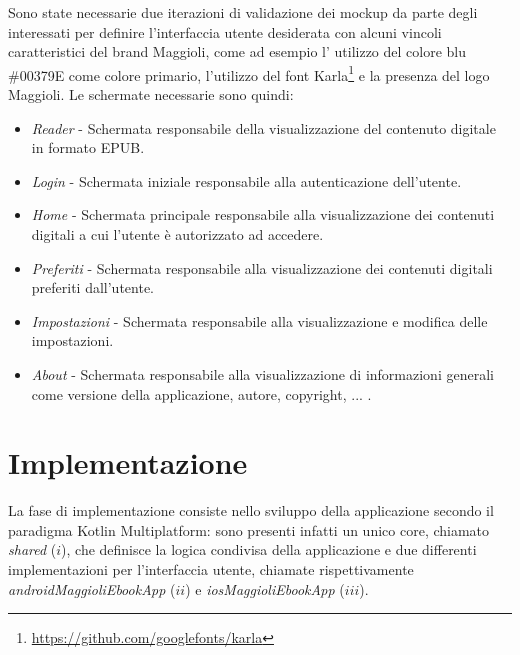 Sono state necessarie due iterazioni di validazione dei mockup da parte degli interessati per definire l'interfaccia utente desiderata con alcuni vincoli caratteristici del brand Maggioli, come ad esempio l' utilizzo del colore blu \#00379E come colore primario, l'utilizzo del font Karla\footnote{\url{https://github.com/googlefonts/karla}} e la presenza del logo Maggioli. Le schermate necessarie sono quindi:
\begin{itemize}
    \item \textit{Reader} - Schermata responsabile della visualizzazione del contenuto digitale in formato EPUB.
    \item \textit{Login} - Schermata iniziale responsabile alla autenticazione dell'utente.
    \item \textit{Home} - Schermata principale responsabile alla visualizzazione dei contenuti digitali a cui l'utente è autorizzato ad accedere.
    \item \textit{Preferiti} - Schermata responsabile alla visualizzazione dei contenuti digitali preferiti dall'utente.
    \item \textit{Impostazioni} - Schermata responsabile alla visualizzazione e modifica delle impostazioni.
    \item \textit{About} - Schermata responsabile alla visualizzazione di informazioni generali come versione della applicazione, autore, copyright, ... .
\end{itemize}

\section{Implementazione}
La fase di implementazione consiste nello sviluppo della applicazione secondo il paradigma Kotlin Multiplatform: sono presenti infatti un unico core, chiamato \textit{shared} ($i$), che definisce la logica condivisa della applicazione e due differenti implementazioni per l'interfaccia utente, chiamate rispettivamente \textit{androidMaggioliEbookApp} ($ii$) e \textit{iosMaggioliEbookApp} ($iii$).

